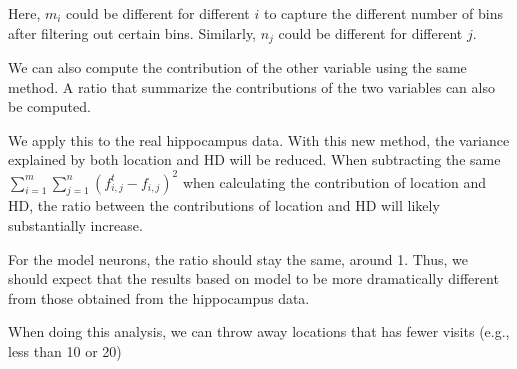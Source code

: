 \documentclass[11pt]{article}
\begin{document}
Here, $m_i$ could be different for different $i$ to capture the different number of bins after filtering out certain bins. Similarly, $n_j$ could be different for different $j$.


We can also compute the contribution of the other variable using the same method. A ratio that summarize the contributions of the two variables can also be computed. 

We apply this to the real hippocampus data. With this new method, the variance explained by both location and HD will be reduced. When subtracting the same $\sum_{i=1}^m\sum_{j=1}^n (f^t_{i,j} -f_{i,j})^2$ when calculating the contribution of location and HD, the ratio between the contributions of location and HD will likely substantially increase. 

For the model neurons, the ratio should stay the same, around 1. Thus, we should expect that the results based on model to be more dramatically different from those obtained from the hippocampus data. 

When doing this analysis, we can throw away locations that has fewer visits (e.g., less than 10 or 20)
\end{document}
